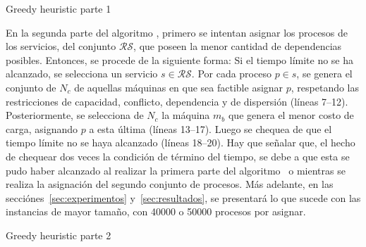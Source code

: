 \documentclass[../informe2.tex]{subfiles}
\begin{document}
\begin{algorithm}[h]
	\caption{Greedy heuristic parte 1}\label{greedy-1}
	\begin{algorithmic}[1]
				\EndIf{}
			\EndFor{}
			\EndIf{}

			\EndIf{}
		\EndFor{}
		\EndProcedure{}
	\end{algorithmic}
\end{algorithm}
\noindent En la segunda parte del algoritmo \greedy, primero se intentan asignar los procesos de los servicios, del conjunto $\mathcal{RS}$, que poseen la menor cantidad de dependencias posibles. Entonces, se procede de la siguiente forma: Si el tiempo límite no se ha alcanzado, se selecciona un servicio $s \in \mathcal{RS}$. Por cada proceso $p \in s$, se genera el conjunto de $N_c$ de aquellas máquinas en que sea factible asignar $p$, respetando las restricciones de capacidad, conflicto, dependencia y de dispersión (líneas 7--12). Posteriormente, se selecciona de $N_c$ la máquina $m_b$ que genera el menor costo de carga, asignando $p$ a esta última (líneas 13--17). Luego se chequea de que el tiempo límite no se haya alcanzado (líneas 18--20). Hay que señalar que, el hecho de chequear dos veces la condición de término del tiempo, se debe a que esta se pudo haber alcanzado al realizar la primera parte del algoritmo \greedy\ o mientras se realiza la asignación del segundo conjunto de procesos. Más adelante, en las secciónes~\ref{sec:experimentos} y~\ref{sec:resultados}, se presentará lo que sucede con las instancias de mayor tamaño, con 40000 o 50000 procesos por asignar.\\

\begin{algorithm}[h]
	\caption{Greedy heuristic parte 2}\label{greedy-2}
	\begin{algorithmic}[1]
			\EndIf{}
					\EndIf{}
				\EndFor{}
				\EndIf{}
				\EndIf{}
			\EndFor{}
		\EndFor{}
		\EndProcedure{}
	\end{algorithmic}
\end{algorithm}
\end{document}

